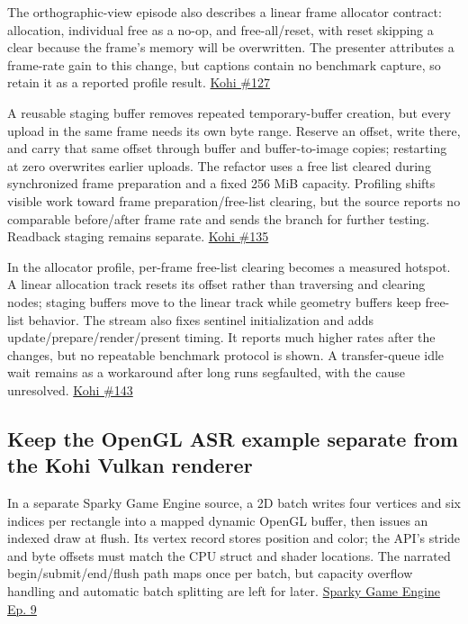 The orthographic-view episode also describes a linear frame allocator contract: allocation, individual free as a no-op, and free-all/reset, with reset skipping a clear because the frame's memory will be overwritten. The presenter attributes a frame-rate gain to this change, but captions contain no benchmark capture, so retain it as a reported profile result. \href{https://www.youtube.com/watch?v=5i66-I3x9ug}{Kohi \#127}

A reusable staging buffer removes repeated temporary-buffer creation, but every upload in the same frame needs its own byte range. Reserve an offset, write there, and carry that same offset through buffer and buffer-to-image copies; restarting at zero overwrites earlier uploads. The refactor uses a free list cleared during synchronized frame preparation and a fixed 256 MiB capacity. Profiling shifts visible work toward frame preparation/free-list clearing, but the source reports no comparable before/after frame rate and sends the branch for further testing. Readback staging remains separate. \href{https://www.youtube.com/watch?v=zdZP0uQ4Pi8}{Kohi \#135}

In the allocator profile, per-frame free-list clearing becomes a measured hotspot. A linear allocation track resets its offset rather than traversing and clearing nodes; staging buffers move to the linear track while geometry buffers keep free-list behavior. The stream also fixes sentinel initialization and adds update/prepare/render/present timing. It reports much higher rates after the changes, but no repeatable benchmark protocol is shown. A transfer-queue idle wait remains as a workaround after long runs segfaulted, with the cause unresolved. \href{https://www.youtube.com/watch?v=jLSfss8YrXE}{Kohi \#143}

\subsection{Keep the OpenGL ASR example separate from the Kohi Vulkan renderer}\label{06-engine-ii-ch026-keep-the-opengl-asr-example-separate-from-the-kohi-vulkan-renderer}

In a separate Sparky Game Engine source, a 2D batch writes four vertices and six indices per rectangle into a mapped dynamic OpenGL buffer, then issues an indexed draw at flush. Its vertex record stores position and color; the API's stride and byte offsets must match the CPU struct and shader locations. The narrated begin/submit/end/flush path maps once per batch, but capacity overflow handling and automatic batch splitting are left for later. \href{https://www.youtube.com/watch?v=ImtWD_9OAeY}{Sparky Game Engine Ep. 9}

